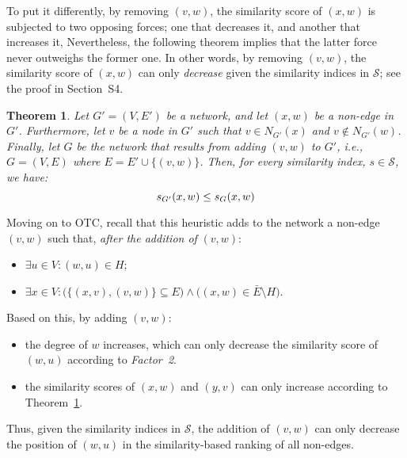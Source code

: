 \documentclass[twocolumn]{article}
\newtheorem{theorem}{Theorem}
\newcommand{\ER}{\bar{E}}
\newcommand{\Hide}{H}
\begin{document}
To put it differently, by removing $(v,w)$, the similarity score of $(x,w)$ is subjected to two opposing forces; one that decreases it, and another that increases it, Nevertheless, the following theorem implies that the latter force never outweighs the former one. In other words, by removing $(v,w)$, the similarity score of $(x,w)$ can only \textit{decrease} given the similarity indices in $\mathcal{S}$; see the proof in Section~S4.

\begin{theorem}\label{theorem:comparingPositiveAndNegativeEffects}
Let $G'=(V,E')$ be a network, and let $(x,w)$ be a non-edge in $G'$. Furthermore, let $v$ be a node in $G'$ such that $v\in N_{G'}(x)$ and $v\not\in N_{G'}(w)$. Finally, let $G$ be the network that results from adding $(v,w)$ to $G'$, i.e., $G=(V,E)$ where $E=E'\cup\{(v,w)\}$. Then, for every similarity index, $s\in\mathcal{S}$, we have:
$$
s_{G'}(x,w) \leq s_{G}(x,w) \smallskip\smallskip
$$
\end{theorem}

Moving on to OTC, recall that this heuristic adds to the network a non-edge $(v,w)$ such that, \textit{after the addition of} $(v,w)$:
\begin{itemize}\itemsep-0.25em
\item $\exists u\in V\!:\!(w,u)\in \Hide$;
\item $\exists x\in V\!:\!\big(\{(x,v),(v,w)\}\subseteq E\big) \wedge \big((x,w)\in\ER\setminus \Hide\big)$.
\end{itemize}

Based on this, by adding $(v,w)$:
\begin{itemize}\itemsep-0.25em
\item the degree of $w$ increases, which can only decrease the similarity score of $(w,u)$ according to \emph{Factor~2}.
\item the similarity scores of $(x,w)$ and $(y,v)$ can only increase according to Theorem~\ref{theorem:comparingPositiveAndNegativeEffects}.
\end{itemize}

Thus, given the similarity indices in $\mathcal{S}$, the addition of $(v,w)$ can only decrease the position of $(w,u)$ in the similarity-based ranking of all non-edges.
\end{document}

